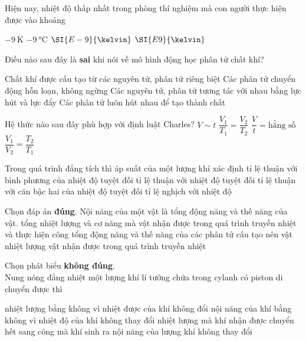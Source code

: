 \begin{ex}
	Hiện nay, nhiệt độ thấp nhất trong phòng thí nghiệm mà con người thực hiện được vào khoảng
	
	\choice
	{$\SI{-9}{\kelvin}$}
	{$\SI{-9}{\celsius}$}
	{\True $\SI{E-9}{\kelvin}$}
	{$\SI{E9}{\kelvin}$}
	\loigiai{}
\end{ex}
\begin{ex}
Điều nào sau đây là \textbf{sai} khi nói về mô hình động học phân tử chất khí?
	
	\choice
	{Chất khí được cấu tạo từ các nguyên tử, phân tử riêng biệt}
	{Các phân tử chuyển động hỗn loạn, không ngừng}
	{Các nguyên tử, phân tử tương tác với nhau bằng lực hút và lực đẩy}
	{\True Các phân tử luôn hút nhau để tạo thành chất}
	\loigiai{}
\end{ex}
\begin{ex}
	Hệ thức nào sau đây phù hợp với định luật Charles?
	\choice
	{$V\sim t$}
	{\True $\dfrac{V_1}{T_1}=\dfrac{V_2}{T_2}$}
	{$\dfrac{V}{t}=\text{hằng số}$}
	{$\dfrac{V_1}{V_2}=\dfrac{T_2}{T_1}$}
	\loigiai{}
\end{ex}
\begin{ex}
	Trong quá trình đẳng tích thì áp suất của một lượng khí xác định
	\choice
	{tỉ lệ thuận với bình phương của nhiệt độ tuyệt đối}
	{\True tỉ lệ thuận với nhiệt độ tuyệt đối}
	{tỉ lệ thuận với căn bậc hai của nhiệt độ tuyệt đối}
	{tỉ lệ nghịch với nhiệt độ}
	\loigiai{}
\end{ex}
\begin{ex}
Chọn đáp án \textbf{đúng}. Nội năng của một vật là
	\choice
	{tổng động năng và thế năng của vật.  }
	{tổng nhiệt lượng và cơ năng mà vật nhận được trong quá trình truyền nhiệt và thực hiện công}
	{\True tổng động năng và thế năng của các phân tử cấu tạo nên vật}
	{nhiệt lượng vật nhận được trong quá trình truyền nhiệt}
	\loigiai{}
\end{ex}
\begin{ex}
Chọn phát biểu \textbf{không đúng}.\\
Nung nóng đẳng nhiệt một lượng khí lí tưởng chứa trong cylanh có piston di chuyển được thì
	
	\choice
	{nhiệt lượng bằng không vì nhiệt được của khí không đổi}
	{\True nội năng của khí bằng không vì nhiệt độ của khí không thay đổi}
	{nhiệt lượng mà khí nhận được chuyển hết sang công mà khí sinh ra}
	{nội năng của lượng khí không thay đổi}
	\loigiai{}
\end{ex}

